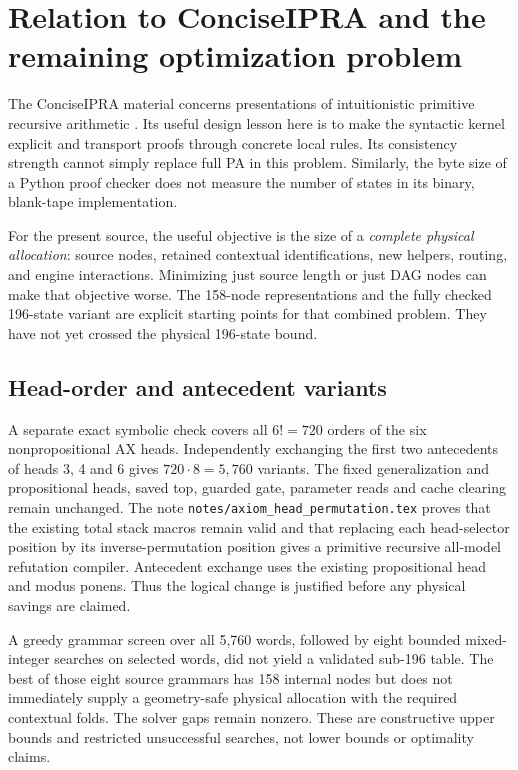 \documentclass[11pt,letterpaper]{article}
\newcommand{\file}[1]{\texttt{\nolinkurl{#1}}}
\begin{document}
\section{Relation to ConciseIPRA and the remaining optimization problem}

The ConciseIPRA material concerns presentations of intuitionistic primitive
recursive arithmetic \cite{ipra}. Its useful design lesson here is to
make the syntactic kernel explicit and transport proofs through concrete
local rules. Its consistency strength cannot simply replace full PA in
this problem. Similarly, the byte size of a Python proof checker does not
measure the number of states in its binary, blank-tape implementation.

For the present source, the useful objective is the size of a \emph{complete
physical allocation}: source nodes, retained contextual identifications,
new helpers, routing, and engine interactions. Minimizing just source
length or just DAG nodes can make that objective worse. The 158-node
representations and the fully checked 196-state variant are explicit
starting points for that combined problem. They have not yet crossed
the physical 196-state bound.

\subsection{Head-order and antecedent variants}

A separate exact symbolic check covers all $6!=720$ orders of the six
nonpropositional AX heads. Independently exchanging the first two
antecedents of heads 3, 4 and 6 gives $720\cdot 8=5,760$ variants.
The fixed generalization and propositional heads, saved top, guarded gate,
parameter reads and cache clearing remain unchanged. The note
\file{notes/axiom_head_permutation.tex} proves that the existing total
stack macros remain valid and that replacing each head-selector position
by its inverse-permutation position gives a primitive recursive all-model
refutation compiler. Antecedent exchange uses the existing propositional
head and modus ponens. Thus the logical change is justified before any
physical savings are claimed.

A greedy grammar screen over all 5,760 words, followed by eight bounded
mixed-integer searches on selected words, did not yield a validated
sub-196 table. The best of those eight source grammars has 158 internal
nodes but does not immediately supply a geometry-safe physical allocation
with the required contextual folds. The solver gaps remain nonzero. These are constructive
upper bounds and restricted unsuccessful searches, not lower bounds or
optimality claims.
\end{document}
